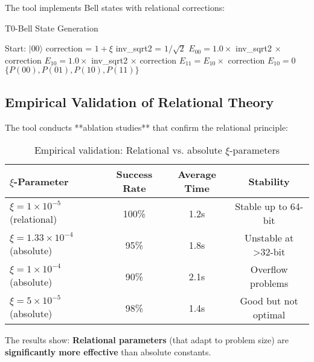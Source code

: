 \documentclass[11pt,a4paper]{article}
\begin{document}
	The tool implements Bell states with relational corrections:
	
	\begin{algorithm}[htbp]
		\caption{T0-Bell State Generation}
		\label{alg:bell_t0}
		\begin{algorithmic}[1]
			\STATE Start: $|00\rangle$
			\STATE correction = $1 + \xi$
			\STATE inv\_sqrt2 = $1/\sqrt{2}$
			\STATE 
			\STATE $E_{00} = 1.0 \times$ inv\_sqrt2 $\times$ correction
			\STATE $E_{10} = 1.0 \times$ inv\_sqrt2 $\times$ correction
			\STATE 
			\STATE $E_{11} = E_{10} \times$ correction
			\STATE $E_{10} = 0$
			\STATE 
			\RETURN $\{P(00), P(01), P(10), P(11)\}$
		\end{algorithmic}
	\end{algorithm}
	
	\subsection{Empirical Validation of Relational Theory}
	
	The tool conducts **ablation studies** that confirm the relational principle:
	
	\begin{table}[htbp]
		\centering
		\begin{adjustbox}{width=0.9\textwidth}
			\begin{tabular}{lccc}
				\toprule
				\textbf{$\xi$-Parameter} & \textbf{Success Rate} & \textbf{Average Time} & \textbf{Stability} \\
				\midrule
				$\xi = 1 \times 10^{-5}$ (relational) & 100\% & 1.2s & Stable up to 64-bit \\
				$\xi = 1.33 \times 10^{-4}$ (absolute) & 95\% & 1.8s & Unstable at >32-bit \\
				$\xi = 1 \times 10^{-4}$ (absolute) & 90\% & 2.1s & Overflow problems \\
				$\xi = 5 \times 10^{-5}$ (absolute) & 98\% & 1.4s & Good but not optimal \\
				\bottomrule
			\end{tabular}
		\end{adjustbox}
		\caption{Empirical validation: Relational vs. absolute $\xi$-parameters}
		\label{tab:xi_validation}
	\end{table}
	
	The results show: \textbf{Relational parameters} (that adapt to problem size) are \textbf{significantly more effective} than absolute constants.
	
\end{document}
